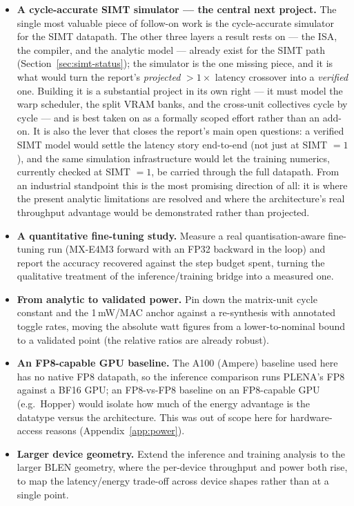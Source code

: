 \documentclass[11pt]{report}
\begin{document}
\begin{itemize}
\item \textbf{A cycle-accurate SIMT simulator --- the central next project.}
The single most valuable piece of follow-on work is the cycle-accurate
simulator for the SIMT datapath. The other three layers a result rests on ---
the ISA, the compiler, and the analytic model --- already exist for the SIMT
path (Section~\ref{sec:simt-status}); the simulator is the one missing piece,
and it is what would turn the report's \emph{projected} $>$$1\times$ latency
crossover into a \emph{verified} one. Building it is a substantial project in
its own right --- it must model the warp scheduler, the split VRAM banks, and
the cross-unit collectives cycle by cycle --- and is best taken on as a
formally scoped effort rather than an add-on. It is also the lever that
closes the report's main open questions: a verified SIMT model would settle
the latency story end-to-end (not just at SIMT $=1$), and the same simulation
infrastructure would let the training numerics, currently checked at
SIMT $=1$, be carried through the full datapath. From an industrial
standpoint this is the most promising direction of all: it is where the
present analytic limitations are resolved and where the architecture's real
throughput advantage would be demonstrated rather than projected.
\item \textbf{A quantitative fine-tuning study.} Measure a real
quantisation-aware fine-tuning run (MX-E4M3 forward with an FP32 backward in
the loop) and report the accuracy recovered against the step budget spent,
turning the qualitative treatment of the inference/training bridge into a
measured one.
\item \textbf{From analytic to validated power.} Pin down the matrix-unit
cycle constant and the 1\,mW/MAC anchor against a re-synthesis with annotated
toggle rates, moving the absolute watt figures from a lower-to-nominal bound
to a validated point (the relative ratios are already robust).
\item \textbf{An FP8-capable GPU baseline.} The A100 (Ampere) baseline used
here has no native FP8 datapath, so the inference comparison runs PLENA's
FP8 against a BF16 GPU; an FP8-vs-FP8 baseline on an FP8-capable GPU (e.g.\
Hopper) would isolate how much of the energy advantage is the datatype versus
the architecture. This was out of scope here for hardware-access reasons
(Appendix~\ref{app:power}).
\item \textbf{Larger device geometry.} Extend the inference and training
analysis to the larger BLEN geometry, where the per-device throughput and
power both rise, to map the latency/energy trade-off across device shapes
rather than at a single point.
\end{itemize}
\end{document}
